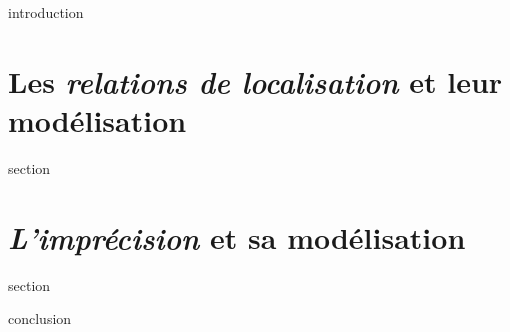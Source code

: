 
\chaptertoc{}

\label{sec:3-int}
{introduction}

\section{Les \emph{relations de localisation} et leur modélisation}
\label{sec:3-1}
{section}

\section{\emph{L'imprécision} et sa modélisation}
\label{sec:3-2}
{section}


\label{sec:3-cnc}
{conclusion}

